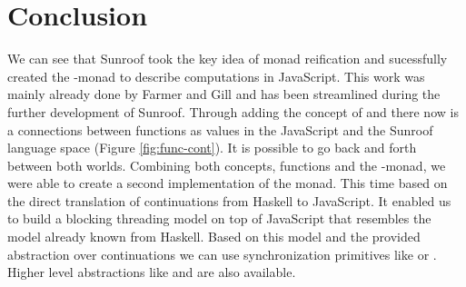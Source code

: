  
\section{Conclusion}

We can see that Sunroof took the key idea of monad reification and
sucessfully created the \JS-monad to describe computations
in JavaScript. This work was mainly already done by Farmer and
Gill \cite{Farmer:12:WebDSLs} and has been streamlined during the 
further development of Sunroof. Through adding the concept 
of  and  there now is a connections between
functions as values in the JavaScript and the Sunroof language space 
(Figure \ref{fig:func-cont}). It is possible to go back and forth between 
both worlds. Combining both concepts, functions and the \JS-monad,
we were able to create a second implementation of the monad. This
time based on the direct translation of continuations from Haskell
to JavaScript. It enabled us to build a blocking threading model
on top of JavaScript that resembles the model already known from Haskell.
Based on this model and the provided abstraction over continuations
we can use synchronization primitives like  or .
Higher level abstractions like  and  are also
available. 
